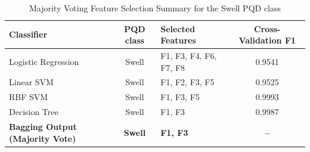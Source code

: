 

\begin{table}[htbp]
\caption{Majority Voting Feature Selection Summary for the Swell PQD class}
\label{tab:majority_voting_summary}
\centering
\begin{tabularx}{\columnwidth}{>{\raggedright\arraybackslash}X c >{\raggedright\arraybackslash}X c}
\hline
\hline
\textbf{Classifier} & \textbf{PQD class} & \textbf{Selected Features} & \textbf{Cross-Validation F1} \\
\hline
Logistic Regression & Swell & F1, F3, F4, F6, F7, F8 & 0.9541 \\
Linear SVM          & Swell & F1, F2, F3, F5         & 0.9525 \\
RBF SVM             & Swell & F1, F3, F5             & 0.9993 \\
Decision Tree       & Swell & F1, F3                 & 0.9987 \\
\hline
\hline
\textbf{Bagging Output (Majority Vote)} & \textbf{Swell} & \textbf{F1, F3} & \textbf{--} \\
\hline
\hline
\end{tabularx}
\end{table}


